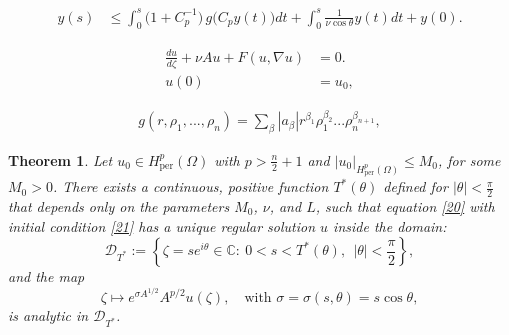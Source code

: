 \documentclass[10pt,a4paper]{amsart}
\newtheorem{theorem}{Theorem}
\begin{document}
\begin{align}
    y(s) &\leq \int_0^s  \!\bigl(1 + C_p^{-1}\bigr)\,
    g \bigl(C_p y(t)\bigl) dt+ \int_0^s  \frac{1}{\nu \cos\theta} y(t)dt
    + y(0).\label{12}
\end{align}

\begin{align}
    \frac{du}{d\zeta} + \nu Au + F(u,\nabla u) &= 0 .\label{20}\\
    u(0) &= u_0,  \label{21}
\end{align}

\begin{align}
    g(r,\rho_1,...,\rho_n)=\sum_\beta |a_\beta| r^{\beta_ 1}\rho_1^{\beta_ 2}...\rho_n^{\beta_{n+1}}, \label{22}
\end{align}

\begin{theorem}
Let $u_0 \in {H}^p_{\text{per}}(\Omega)$ with \( p > \frac{n}{2}+1 \) and $|u_0|_{{H}^p_{\text{per}}(\Omega)} \le M_0$, for some $M_0 > 0$. There exists a continuous, positive function $T^*(\theta)$ defined for $|\theta| < \frac{\pi}{2}$ that depends only on the parameters $M_0$, $\nu$, and $L$, such that equation \eqref{20} with initial condition \eqref{21} has a unique regular solution $u$ inside the domain:
\[
\mathcal{D}_{T^*} := \left\{\zeta = s e^{i\theta} \in \mathbb{C} :\ 0 < s < T^*(\theta), \ \ |\theta| < \frac{\pi}{2}\right\},
\]
and the map
\[
\zeta \longmapsto e^{\sigma A^{1/2}} A^{p/2} u(\zeta), \quad \text{with } \sigma = \sigma(s,\theta) = s\cos\theta,
\]
is analytic in $\mathcal{D}_{T^*}$.
\end{theorem}
\end{document}
